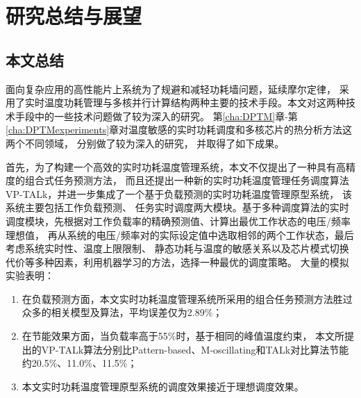 

\chapter{研究总结与展望}
\label{cha:Conclusion}

\section{本文总结}
面向复杂应用的高性能片上系统为了规避和减轻功耗墙问题，延续摩尔定律， 采用了实时温度功耗管理与多核并行计算结构两种主要的技术手段。本文对这两种技术手段中的一些技术问题做了较为深入的研究。
第\ref{cha:DPTM}章-第\ref{cha:DPTMexperiments}章对温度敏感的实时功耗调度和多核芯片的热分析方法这两个不同领域， 分别做了较为深入的研究， 并取得了如下成果。

首先，为了构建一个高效的实时功耗温度管理系统，本文不仅提出了一种具有高精度的组合式任务预测方法， 而且还提出一种新的实时功耗温度管理任务调度算法VP-TALk，并进一步集成了一个基于负载预测的实时功耗温度管理原型系统， 该系统主要包括工作负载预测、 任务实时调度两大模块。基于多种调度算法的实时调度模块，先根据对工作负载率的精确预测值、计算出最优工作状态的电压/频率理想值， 再从系统的电压/频率对的实际设定值中选取相邻的两个工作状态，最后考虑系统实时性、温度上限限制、 静态功耗与温度的敏感关系以及芯片模式切换代价等多种因素，利用机器学习的方法，选择一种最优的调度策略。
大量的模拟实验表明：
\begin{enumerate}[1)]
\item 在负载预测方面，本文实时功耗温度管理系统所采用的组合任务预测方法胜过众多的相关模型及算法，平均误差仅为2.89\%；
\item 在节能效果方面，当负载率高于55\%时，基于相同的峰值温度约束， 本文所提出的VP-TALk算法分别比Pattern-based、M-oscillating和TALk对比算法节能约20.5\%、11.0\%、11.5\%；
\item 本文实时功耗温度管理原型系统的调度效果接近于理想调度效果。
\end{enumerate}

